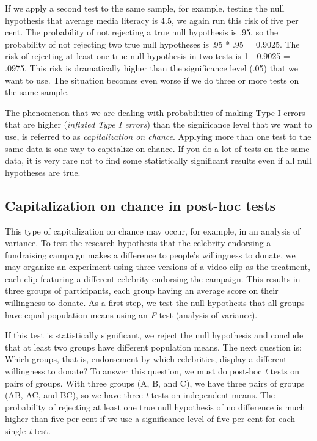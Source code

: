 \documentclass[a4paper]{book}
\theoremstyle{definition}
\theoremstyle{definition}
\theoremstyle{definition}
\theoremstyle{remark}
\begin{document}
If we apply a second test to the same sample, for example, testing the
null hypothesis that average media literacy is 4.5, we again run this
risk of five per cent. The probability of not rejecting a true null
hypothesis is .95, so the probability of not rejecting two true null
hypotheses is .95 * .95 = 0.9025. The risk of rejecting at least one
true null hypothesis in two tests is 1 - 0.9025 = .0975. This risk is
dramatically higher than the significance level (.05) that we want to
use. The situation becomes even worse if we do three or more tests on
the same sample.

The phenomenon that we are dealing with probabilities of making Type I
errors that are higher (\emph{inflated Type I errors}) than the
significance level that we want to use, is referred to as
\emph{capitalization on chance}. Applying more than one test to the same
data is one way to capitalize on chance. If you do a lot of tests on the
same data, it is very rare not to find some statistically significant
results even if all null hypotheses are true.

\subsection{Capitalization on chance in post-hoc
tests}\label{capitalization-on-chance-in-post-hoc-tests}

This type of capitalization on chance may occur, for example, in an
analysis of variance. To test the research hypothesis that the celebrity
endorsing a fundraising campaign makes a difference to people's
willingness to donate, we may organize an experiment using three
versions of a video clip as the treatment, each clip featuring a
different celebrity endorsing the campaign. This results in three groups
of participants, each group having an average score on their willingness
to donate. As a first step, we test the null hypothesis that all groups
have equal population means using an \emph{F} test (analysis of
variance).

If this test is statistically significant, we reject the null hypothesis
and conclude that at least two groups have different population means.
The next question is: Which groups, that is, endorsement by which
celebrities, display a different willingness to donate? To answer this
question, we must do post-hoc \emph{t} tests on pairs of groups. With
three groups (A, B, and C), we have three pairs of groups (AB, AC, and
BC), so we have three \emph{t} tests on independent means. The
probability of rejecting at least one true null hypothesis of no
difference is much higher than five per cent if we use a significance
level of five per cent for each single \emph{t} test.
\end{document}
